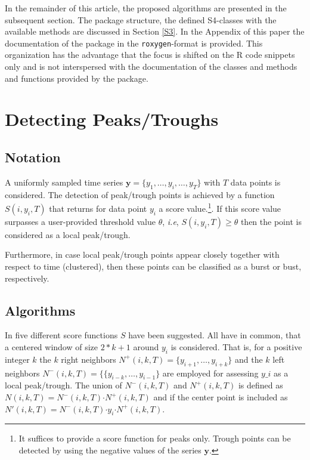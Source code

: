 \documentclass[a4paper]{article}
\begin{document}
In the remainder of this article, the proposed algorithms are
presented in the subsequent section. The package structure, the
defined S4-classes with the available methods are discussed in Section
\ref{S3}. In the Appendix of this paper the documentation of the
package in the \texttt{roxygen}-format is provided. This organization
has the advantage that the focus is shifted on the R code snippets
only and is not interspersed with the documentation of the classes and
methods and functions provided by the package.

\section{Detecting Peaks/Troughs}
\label{S2}

\subsection{Notation}
\label{S2SS1}

A uniformly sampled time series $\mathbf{y} = \{y_1, \ldots, y_i,
\ldots, y_T\}$ with $T$ data points is considered. The detection of
peak/trough points is achieved by a function $S(i, y_i, T)$ that
returns for data point $y_i$ a score value.\footnote{It suffices to
  provide a score function for peaks only. Trough points can be
  detected by using the negative values of the series $\mathbf{y}$.}.
If this score value surpasses a user-provided threshold value
$\theta$, \emph{i.e}, $S(i, y_i, T) \ge \theta$ then the point is
considered as a local peak/trough.\par

Furthermore, in case local peak/trough points appear closely together
with respect to time (clustered), then these points can be classified
as a burst or bust, respectively.

\subsection{Algorithms}
\label{S2SS2}

In \citet{PAL2009} five different score functions $S$ have been
suggested. All have in common, that a centered window of size $2*k +
1 $ around $y_i$ is considered. That is, for a positive integer $k$
the $k$ right neighbors $N^+(i,k, T) = \{y_{i+1}, \ldots, y_{i + k}\}$
and the $k$ left neighbors $N^-(i, k, T) = \{\{y_{i-k}, \ldots,
y_{i-1}\}$ are employed for assessing $y\_i$ as a local
peak/trough. The union of $N^-(i, k, T)$ and $N^+(i, k, T)$ is defined
as $N(i, k, T) = N^-(i, k, T) \mathord{\cdot} N^+(i, k, T)$ and if the
center point is included as $N'(i, k, T) = N^-(i, k, T) \mathord{\cdot}
y_i \mathord{\cdot} N^+(i, k, T)$.\par
\end{document}
